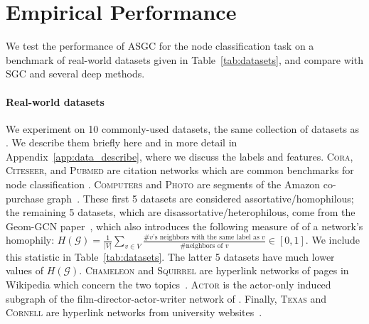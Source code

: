 \documentclass{article}
\newcommand{\Cam}[1]{\textcolor{blue}{Cam: #1}}
\begin{document}



\section{Empirical Performance}\label{sec:results}
We test the performance of ASGC for the node classification task on a benchmark of real-world datasets given in Table~\ref{tab:datasets}, and compare with SGC and several deep methods.

\paragraph{Real-world datasets} 
We experiment on 10 commonly-used datasets, the same collection of datasets as \citet{chien2020adaptive}. We describe them briefly here and in more detail in Appendix~\ref{app:data_describe}, where we discuss the labels and features.
\textsc{Cora}, \textsc{Citeseer}, and \textsc{Pubmed} are citation networks which are common benchmarks for node classification \citep{sen2008collective, namata2012query}.
\textsc{Computers} and \textsc{Photo} are segments of the Amazon co-purchase graph~\citep{mcauley2015image, shchur2018pitfalls}.
These first 5 datasets are considered assortative/homophilous; the remaining 5 datasets, which are disassortative/heterophilous, come from the Geom-GCN paper~\citep{pei2020geom}, which also introduces the following measure of of a network's homophily: 
\mbox{$ H(\mathcal{G}) = \frac{1}{|V|} \sum_{v \in V} \frac{\text{\# $v$'s neighbors with the same label as $v$}}{\text{\# neighbors of $v$}} \in [0,1]$}.
We include this statistic in Table~\ref{tab:datasets}.
The latter 5 datasets have much lower values of $H(\mathcal{G})$.
\textsc{Chameleon} and \textsc{Squirrel} are hyperlink networks of pages in Wikipedia which concern the two topics~\citep{rozemberczki2021multi}.
\textsc{Actor} is the actor-only induced subgraph of the film-director-actor-writer network of \citet{tang2009relational}.
Finally, \textsc{Texas} and \textsc{Cornell} are hyperlink networks from university websites~\citep{craven2000learning}.
\end{document}
